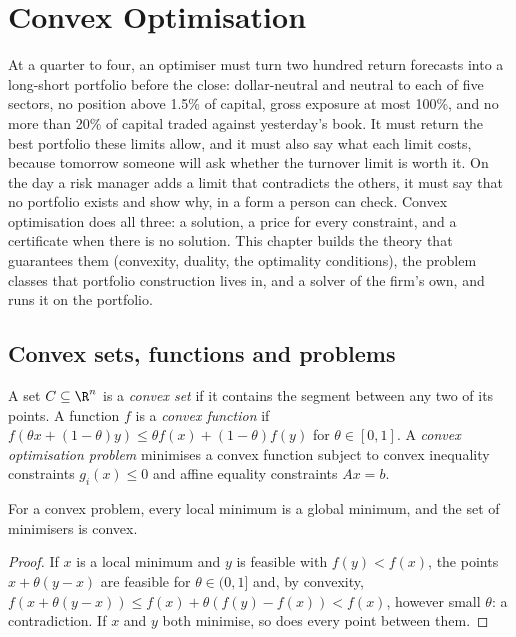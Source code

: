 \chapter{Convex Optimisation}\label{ch:qm:convex-optimisation}

At a quarter to four, an optimiser must turn two hundred return forecasts into a long-short portfolio before the close: dollar-neutral and
neutral to each of five sectors, no position above 1.5\% of capital, gross exposure at most 100\%, and no more than 20\% of capital traded
against yesterday's book. It must return the best portfolio these limits allow, and it must also say what each limit costs, because tomorrow
someone will ask whether the turnover limit is worth it. On the day a risk manager adds a limit that contradicts the others, it must say that no
portfolio exists and show why, in a form a person can check. Convex optimisation does all three: a solution, a price for every constraint, and a
certificate when there is no solution. This chapter builds the theory that guarantees them (convexity, duality, the optimality conditions), the
problem classes that portfolio construction lives in, and a solver of the firm's own, and runs it on the portfolio.

\section{Convex sets, functions and problems}

\begin{definition}\label{def:qm:convex-optimisation:convex}
A set $C \subseteq \R^n$ is a \emph{convex set} if it contains the segment between any two of its points. A function $f$ is a \emph{convex
function} if $f(\theta x + (1 - \theta)y) \le \theta f(x) + (1 - \theta)f(y)$ for $\theta \in [0, 1]$. A \emph{convex optimisation
problem} minimises a convex function subject to convex inequality constraints $g_i(x) \le 0$ and affine equality constraints
$Ax = b$.
\end{definition}

\begin{proposition}\label{prop:qm:convex-optimisation:local}
For a convex problem, every local minimum is a global minimum, and the set of minimisers is convex.
\end{proposition}

\begin{proof}
If $x$ is a local minimum and $y$ is feasible with $f(y) < f(x)$, the points $x + \theta(y - x)$ are feasible for $\theta \in (0, 1]$ and, by convexity, $f(x + \theta(y -
x)) \le f(x) + \theta(f(y) - f(x)) < f(x)$, however small $\theta$: a contradiction. If $x$ and $y$ both minimise, so does every point between them.
\end{proof}

